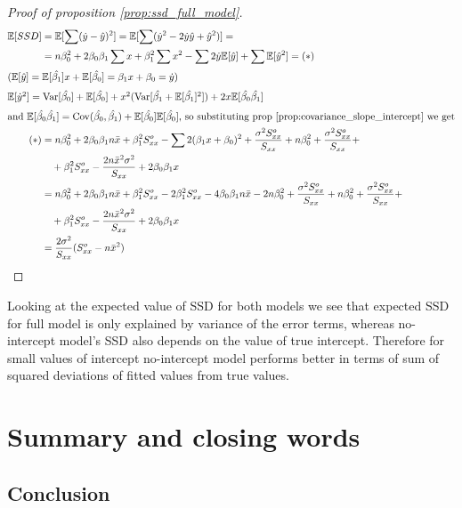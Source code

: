 \documentclass[12pt,a4paper,oneside]{book} %
\newcommand{\E}{\mathbb{E}}
\newcommand{\Var}{\mathrm{Var}}
\newcommand{\Cov}{\mathrm{Cov}}
\begin{document}
\begin{proof}[Proof of proposition \ref{prop:ssd_full_model}]
	\begin{align*}
		\E[SSD] &= \E[\sum (\dot{y}-\hat{y})^2] = \E [\sum (\dot{y}^2 - 2 \dot{y}\hat{y}+\hat{y}^2)]= \\
		&= n \beta_0^2 + 2 \beta_0 \beta_1 \sum x + \beta_1^2 \sum x^2 - \sum 2 \dot{y} \E [\hat{y}] + \sum \E [\hat{y}^2] = (\ast)\\
		\intertext{($\E [\hat{y}] = \E [\hat{\beta_1}]x + \E [\hat{\beta_0}] = \beta_1 x + \beta_0=\dot{y}$)}
		\intertext{$\E[\dot{y}^2]=\Var[\hat{\beta_0}]+\E[\hat{\beta_0}]+x^2(\Var [\hat{\beta_1}+\E [\hat{\beta_1}]^2])+2x\E[\hat{\beta_0}\hat{\beta_1}]$}
		\intertext{and $\E[\hat{\beta_0}\hat{\beta_1}]= \Cov (\hat{\beta_0},\hat{\beta_1})+\E[\hat{\beta_0}]\E[\hat{\beta_0}]$, so substituting prop \ref{prop:covariance_slope_intercept} we get}
		(\ast) &= n \beta_0^2+2\beta_0 \beta_1 n \bar{x} + \beta_1^2 S_{xx}^o - \sum 2(\beta_1x+\beta_0)^2+\frac{\sigma^2 S_{xx}^o}{S_{xx}}+n\beta_0^2+ \frac{\sigma^2 S_{xx}^o}{S_{xx}} + \\
		& \quad +\beta_1^2 S_{xx}^o-\frac{2n\bar{x}^2\sigma^2}{S_{xx}}+2\beta_0\beta_1x \\
		&= n \beta_0^2+2\beta_0 \beta_1 n \bar{x} + \beta_1^2 S_{xx}^o -2\beta_1^2 S_{xx}^o-4\beta_0\beta_1n\bar{x} -2n\beta_0^2+\frac{\sigma^2 S_{xx}^o}{S_{xx}}+n\beta_0^2+ \frac{\sigma^2 S_{xx}^o}{S_{xx}} + \\
		& \quad +\beta_1^2 S_{xx}^o-\frac{2n\bar{x}^2\sigma^2}{S_{xx}}+2\beta_0\beta_1x \\
		&= \frac{2\sigma^2}{S_{xx}}(S_{xx}^o-n\bar{x}^2)
	\end{align*}
\end{proof}

Looking at the expected value of SSD for both models we see that expected SSD for full model is only explained by variance of the error terms, whereas no-intercept model's SSD also depends on the value of true intercept. Therefore for small values of intercept no-intercept model performs better in terms of sum of squared deviations of fitted values from true values.


\clearpage



		
	\chapter{Summary and closing words}
	
	\section{Conclusion}
	
\end{document}

